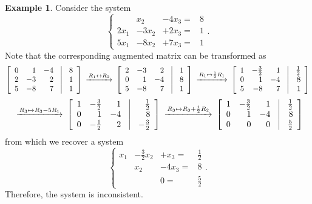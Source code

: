 \documentclass[12pt,letterpaper]{book}
\numberwithin{equation}{section}
\theoremstyle{definition}
\newtheorem{example}[thm]{\textbf{Example}}
\begin{document}
\begin{example} Consider the system
$$\left\{\begin{array}{rrrr}
&x_2&-4x_3=&8
\\ 2x_1&-3x_2 &+2x_3=&1 \\ 5x_1&-8x_2&+7x_3=&1 \end{array}\right. .$$
Note that the corresponding augmented matrix can be transformed as
$$\begin{CD}
\left[\begin{array}{rrr@{\quad}|@{\quad}r}0&1&-4& 8\\2&-3&2& 1
\\5&-8&7& 1\end{array}\right] @>R_1\leftrightarrow R_2>>
\left[\begin{array}{rrr@{\quad}|@{\quad}r}2&-3&2& 1
\\ 0&1&-4& 8\\5&-8&7& 1\end{array}\right] @>R_1\mapsto \frac{1}{2}R_1>> \left[\begin{array}{rrr@{\quad}|@{\quad}r}1&-\frac{3}{2}&1& \frac{1}{2}
\\ 0&1&-4& 8\\5&-8&7& 1\end{array}\right]\end{CD}$$
$$\begin{CD} @>R_3 \mapsto R_3-5R_1>>  \left[\begin{array}{rrr@{\quad}|@{\quad}r}1&-\frac{3}{2}&1& \frac{1}{2}
\\ 0&1&-4& 8\\0&-\frac{1}{2}&2& -\frac{3}{2}\end{array}\right] @>R_3 \mapsto R_3+\frac{1}{2}R_2>> \left[\begin{array}{rrr@{\quad}|@{\quad}r}1&-\frac{3}{2}&1& \frac{1}{2}
\\ 0&1&-4& 8\\0&0&0& \frac{5}{2}\end{array}\right]
\end{CD}$$
from which we recover a system
$$\left\{\begin{array}{rrrr}
x_1&-\frac{3}{2}x_2&+x_3=&\frac{1}{2}
\\  & x_2 &-4x_3=&8\\  & &0=&\frac{5}{2} \end{array}\right. .$$
Therefore, the system is inconsistent.
\end{example}
\end{document}
